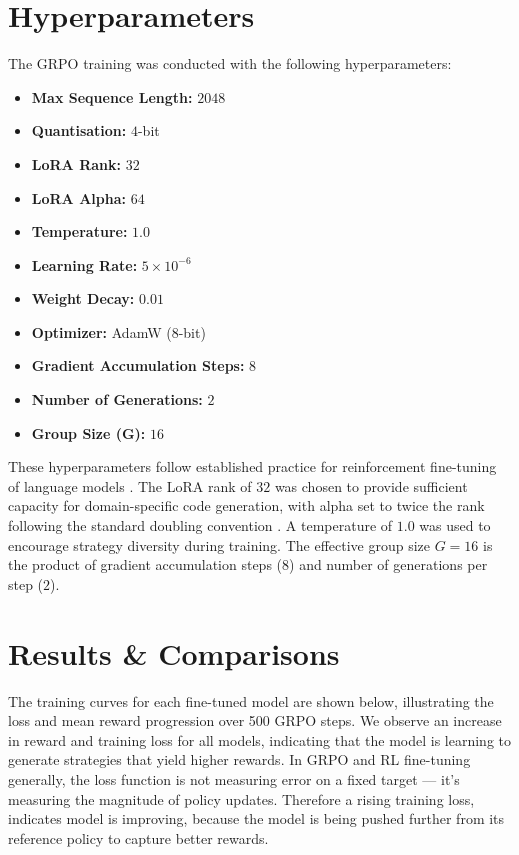 \documentclass[12pt, a4paper]{report}
\begin{document}
\section{Hyperparameters}
\label{sec:hyperparameters}
The GRPO training was conducted with the following hyperparameters:
\begin{itemize}
  \item \textbf{Max Sequence Length:} $2048$
  \item \textbf{Quantisation:} $4$-bit
  \item \textbf{LoRA Rank:} $32$
  \item \textbf{LoRA Alpha:} $64$
  \item \textbf{Temperature:} $1.0$ 
  \item \textbf{Learning Rate:} $5 \times 10^{-6}$
  \item \textbf{Weight Decay:} $0.01$
  \item \textbf{Optimizer:} AdamW (8-bit)
  \item \textbf{Gradient Accumulation Steps:} $8$
  \item \textbf{Number of Generations:} $2$
  \item \textbf{Group Size (G):}  $16$
\end{itemize}

These hyperparameters follow established practice for reinforcement fine-tuning 
of language models \cite{unsloth2024, openai2024rft}. The LoRA rank of $32$ was 
chosen to provide sufficient capacity for domain-specific code generation, with 
alpha set to twice the rank following the standard doubling convention \cite{hu2021lora}. 
A temperature of $1.0$ was used to encourage strategy diversity during training. 
The effective group size $G = 16$ is the product of gradient accumulation steps 
($8$) and number of generations per step ($2$).

\section{Results \& Comparisons}
\label{sec:results}
The training curves for each fine-tuned model are shown below, illustrating the loss and mean reward progression over 500 GRPO steps. 
We observe an increase in reward and training loss for all models, indicating that the model is learning to generate strategies that yield higher rewards.
In GRPO and RL fine-tuning generally, the loss function is not measuring error on a fixed target — it's measuring the magnitude of policy updates. 
Therefore a rising training loss, indicates model is improving, because the model is being pushed further from its reference policy to capture better rewards.
\end{document}
